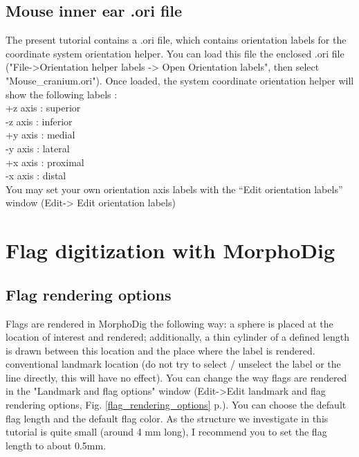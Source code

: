 \documentclass[12pt, a4paper]{book}
\begin{document}
\subsection{Mouse inner ear .ori file}
The present tutorial contains a .ori file, which contains orientation labels for the coordinate system
orientation helper. You can load this file the enclosed .ori file ("File->Orientation helper labels -> Open Orientation labels", then select
"Mouse\_cranium.ori"). Once loaded, the system coordinate orientation helper will show the following
labels :\\
+z axis : superior\\
-z axis : inferior\\
+y axis : medial\\
-y axis : lateral\\
+x axis : proximal\\
-x axis : distal\\
You may set your own orientation axis labels with the “Edit orientation labels” window (Edit-> Edit orientation labels)

\section{Flag digitization with MorphoDig}


\subsection{Flag rendering options}
Flags are rendered in MorphoDig the following way: a sphere is placed at the location of interest and rendered; additionally, a thin cylinder of a defined length is drawn between this location and the place where the label is rendered. 
conventional landmark location (do not try to select / unselect the label or the line directly, this will
have no effect).
You can change the way flags are rendered in the "Landmark and flag options" window
(Edit->Edit landmark and flag rendering options, Fig. \ref{flag_rendering_options} p.\pageref{flag_rendering_options}). You can choose the default flag length and the default flag color. As the structure we investigate in this tutorial is quite small (around 4 mm long), I recommend you to set the flag length to about 0.5mm.
\end{document}
